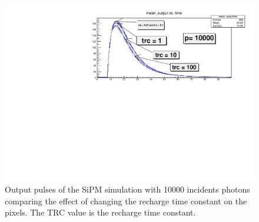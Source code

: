 \begin{figure}
\centering
\includegraphics[width=\linewidth]{Figures/p10000trc.pdf}
\caption{Output pulses of the SiPM simulation with 10000 incidents photons comparing the effect of changing the recharge time constant on the pixels. The TRC value is the recharge time constant.}
\label{fig:trc}
\end{figure}
